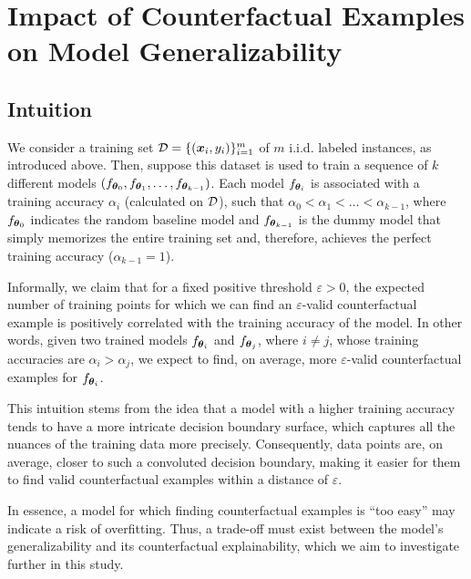 \section{Impact of Counterfactual Examples on Model Generalizability}
\label{sec:problem}

\subsection{Intuition}
We consider a training set $\mathcal{D} = \{(\boldsymbol{x}_i, y_i)\}_{i=1}^m$ of $m$ i.i.d. labeled instances, as introduced above. Then, suppose this dataset is used to train a sequence of $k$ different models $(f_{\boldsymbol{\theta}_0}, f_{\boldsymbol{\theta}_1}, \ldots, f_{\boldsymbol{\theta}_{k-1}})$. Each model $f_{\boldsymbol{\theta}_i}$ is associated with a training accuracy $\alpha_i$ (calculated on $\mathcal{D}$), such that $\alpha_0 < \alpha_1 < \ldots < \alpha_{k-1}$, where $f_{\boldsymbol{\theta}_0}$ indicates the random baseline model and $f_{\boldsymbol{\theta}_{k-1}}$ is the dummy model that simply memorizes the entire training set and, therefore, achieves the perfect training accuracy ($\alpha_{k-1} = 1$).

Informally, we claim that for a fixed positive threshold $\varepsilon > 0$, the expected number of training points for which we can find an $\varepsilon$-valid counterfactual example is positively correlated with the training accuracy of the model. %
In other words, given two trained models $f_{\boldsymbol{\theta}_i}$ and $f_{\boldsymbol{\theta}_j}$, where $i \neq j$, whose training accuracies are $\alpha_i > \alpha_j$, we expect to find, on average, more $\varepsilon$-valid counterfactual examples for $f_{\boldsymbol{\theta}_i}$.

This intuition stems from the idea that a model with a higher training accuracy tends to have a more intricate decision boundary surface, which captures all the nuances of the training data more precisely. Consequently, data points are, on average, closer to such a convoluted decision boundary, making it easier for them to find valid counterfactual examples within a distance of $\varepsilon$.

In essence, a model for which finding counterfactual examples is ``too easy'' may indicate a risk of overfitting. Thus, a trade-off must exist between the model's generalizability and its counterfactual explainability, which we aim to investigate further in this study.


